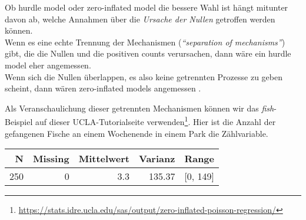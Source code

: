 \documentclass[ngerman,a4paper,]{scrartcl}
\newenvironment{Shaded}{\begin{snugshade}}{\end{snugshade}}
\newcommand{\CommentTok}[1]{\textcolor[rgb]{0.56,0.35,0.01}{\textit{#1}}}
\newcommand{\DataTypeTok}[1]{\textcolor[rgb]{0.13,0.29,0.53}{#1}}
\newcommand{\DecValTok}[1]{\textcolor[rgb]{0.00,0.00,0.81}{#1}}
\newcommand{\FloatTok}[1]{\textcolor[rgb]{0.00,0.00,0.81}{#1}}
\newcommand{\KeywordTok}[1]{\textcolor[rgb]{0.13,0.29,0.53}{\textbf{#1}}}
\newcommand{\NormalTok}[1]{#1}
\newcommand{\OperatorTok}[1]{\textcolor[rgb]{0.81,0.36,0.00}{\textbf{#1}}}
\newcommand{\StringTok}[1]{\textcolor[rgb]{0.31,0.60,0.02}{#1}}
\renewcommand{\href}[2]{#2\footnote{\url{#1}}}
\let\rmarkdownfootnote\footnote%
\def\footnote{\protect\rmarkdownfootnote}
\theoremstyle{definition}
\theoremstyle{definition}
\theoremstyle{definition}
\theoremstyle{remark}
\begin{document}
Ob hurdle model oder zero-inflated model die bessere Wahl ist hängt mitunter davon ab, welche Annahmen über die \emph{Ursache der Nullen} getroffen werden können.\\
Wenn es eine echte Trennung der Mechanismen (\emph{\enquote{separation of mechanisms}}) gibt, die die Nullen und die positiven counts verursachen, dann wäre ein hurdle model eher angemessen.\\
Wenn sich die Nullen überlappen, es also keine getrennten Prozesse zu geben scheint, dann wären zero-inflated models angemessen \citep[p.~209]{hilbeModelingCountData2014}.

Als Veranschaulichung dieser getrennten Mechanismen können wir das \emph{fish}-Beispiel auf \href{https://stats.idre.ucla.edu/sas/output/zero-inflated-poisson-regression/}{dieser UCLA-Tutorialseite verwenden}. Hier ist die Anzahl der gefangenen Fische an einem Wochenende in einem Park die Zählvariable.

\begin{Shaded}
\end{Shaded}

\begin{table}[H]
\centering
\begin{tabular}{rrrrl}
\toprule
N & Missing & Mittelwert & Varianz & Range\\
\midrule
250 & 0 & 3.3 & 135.37 & [0, 149]\\
\bottomrule
\end{tabular}
\end{table}

\begin{Shaded}
\end{Shaded}
\end{document}
